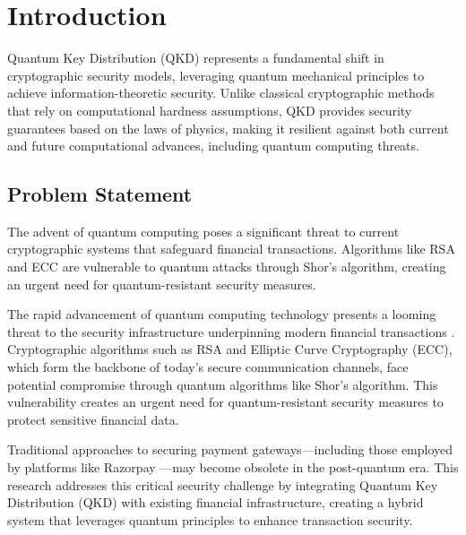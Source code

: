 \documentclass[onecolumn,a4paper,10pt]{IEEEtran}
\begin{document}
\section{Introduction}
Quantum Key Distribution (QKD) represents a fundamental shift in cryptographic security models, leveraging quantum mechanical principles to achieve information-theoretic security. Unlike classical cryptographic methods that rely on computational hardness assumptions, QKD provides security guarantees based on the laws of physics, making it resilient against both current and future computational advances, including quantum computing threats.

\subsection{Problem Statement}
The advent of quantum computing poses a significant threat to current cryptographic systems that safeguard financial transactions. Algorithms like RSA and ECC are vulnerable to quantum attacks through Shor's algorithm, creating an urgent need for quantum-resistant security measures.

The rapid advancement of quantum computing technology presents a looming threat to the security infrastructure underpinning modern financial transactions \cite{quantum_threat}. Cryptographic algorithms such as RSA and Elliptic Curve Cryptography (ECC), which form the backbone of today's secure communication channels, face potential compromise through quantum algorithms like Shor's algorithm. This vulnerability creates an urgent need for quantum-resistant security measures to protect sensitive financial data.

Traditional approaches to securing payment gateways—including those employed by platforms like Razorpay \cite{razorpay}—may become obsolete in the post-quantum era. This research addresses this critical security challenge by integrating Quantum Key Distribution (QKD) with existing financial infrastructure, creating a hybrid system that leverages quantum principles to enhance transaction security.
\end{document}
